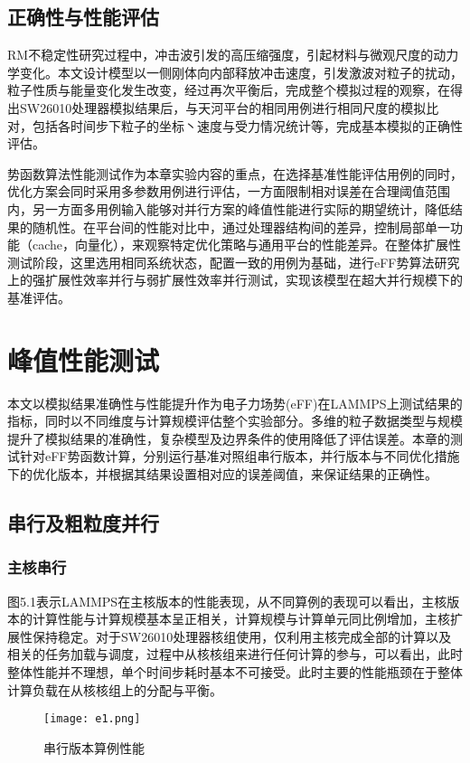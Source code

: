\subsection{正确性与性能评估}
RM不稳定性研究过程中，冲击波引发的高压缩强度，引起材料与微观尺度的动力学变化。本文设计模型以一侧刚体向内部释放冲击速度，引发激波对粒子的扰动，粒子性质与能量变化发生改变，经过再次平衡后，完成整个模拟过程的观察，在得出SW26010处理器模拟结果后，与天河平台的相同用例进行相同尺度的模拟比对，包括各时间步下粒子的坐标丶速度与受力情况统计等，完成基本模拟的正确性评估。

势函数算法性能测试作为本章实验内容的重点，在选择基准性能评估用例的同时，优化方案会同时采用多参数用例进行评估，一方面限制相对误差在合理阈值范围内，另一方面多用例输入能够对并行方案的峰值性能进行实际的期望统计，降低结果的随机性。在平台间的性能对比中，通过处理器结构间的差异，控制局部单一功能（cache，向量化），来观察特定优化策略与通用平台的性能差异。在整体扩展性测试阶段，这里选用相同系统状态，配置一致的用例为基础，进行eFF势算法研究上的强扩展性效率并行与弱扩展性效率并行测试，实现该模型在超大并行规模下的基准评估。

\section{峰值性能测试}
本文以模拟结果准确性与性能提升作为电子力场势(eFF)在LAMMPS上测试结果的指标，同时以不同维度与计算规模评估整个实验部分。多维的粒子数据类型与规模提升了模拟结果的准确性，复杂模型及边界条件的使用降低了评估误差。本章的测试针对eFF势函数计算，分别运行基准对照组串行版本，并行版本与不同优化措施下的优化版本，并根据其结果设置相对应的误差阈值，来保证结果的正确性。

\subsection{串行及粗粒度并行}
\subsubsection{主核串行}
图5.1表示LAMMPS在主核版本的性能表现，从不同算例的表现可以看出，主核版本的计算性能与计算规模基本呈正相关，计算规模与计算单元同比例增加，主核扩展性保持稳定。对于SW26010处理器核组使用，仅利用主核完成全部的计算以及相关的任务加载与调度，过程中从核核组来进行任何计算的参与，可以看出，此时整体性能并不理想，单个时间步耗时基本不可接受。此时主要的性能瓶颈在于整体计算负载在从核核组上的分配与平衡。
 \begin{figure}[h]
  \centering
  \texttt{[image: e1.png]}
  \caption{串行版本算例性能}
\end{figure}

